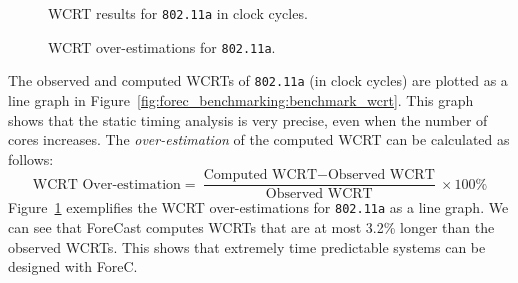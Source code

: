 \begin{figure}
\begin{minipage}[t]{6.5cm}
		\caption{WCRT results for \texttt{802.11a} in clock cycles.}
		\label{fig:forec_benchmarking:benchmark_wcrt}
	\end{minipage}
	\hfill
	\begin{minipage}[t]{6.5cm}
	
		\caption{WCRT over-estimations for \texttt{802.11a}.}
		\label{fig:forec_benchmarking:benchmark_wcrt_over}
	\end{minipage}
\end{figure}

The observed and computed WCRTs of \verb$802.11a$ (in clock
cycles) are plotted as a line graph in
Figure~\ref{fig:forec_benchmarking:benchmark_wcrt}. This
graph shows that the static timing analysis is very
precise, even when the number of cores increases. 
The \emph{over-estimation} of the computed WCRT 
can be calculated as follows:
\begin{equation*}
	\text{WCRT Over-estimation} = \frac{\text{Computed WCRT} - \text{Observed WCRT}}{\text{Observed WCRT}} \times 100\%
\end{equation*}
Figure~\ref{fig:forec_benchmarking:benchmark_wcrt_over} 
exemplifies the WCRT over-estimations for 
\verb$802.11a$ as a line graph. We can see that
ForeCast computes WCRTs that are at most 3.2\% longer than the
observed WCRTs. This shows that extremely time predictable 
systems can be designed with ForeC.

